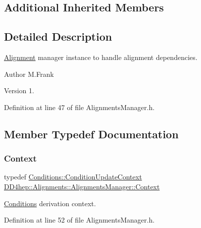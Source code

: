 \subsection*{Additional Inherited Members}


\subsection{Detailed Description}
\hyperlink{class_d_d4hep_1_1_alignments_1_1_alignment}{Alignment} manager instance to handle alignment dependencies. 

\begin{DoxyAuthor}{Author}
M.\+Frank 
\end{DoxyAuthor}
\begin{DoxyVersion}{Version}
1. 
\end{DoxyVersion}


Definition at line 47 of file Alignments\+Manager.\+h.



\subsection{Member Typedef Documentation}
\hypertarget{class_d_d4hep_1_1_alignments_1_1_alignments_manager_a6756d14a9af79dbc28296c765f6bf581}{}\label{class_d_d4hep_1_1_alignments_1_1_alignments_manager_a6756d14a9af79dbc28296c765f6bf581} 
\subsubsection{\texorpdfstring{Context}{Context}}
{\footnotesize\ttfamily typedef \hyperlink{class_d_d4hep_1_1_conditions_1_1_condition_update_context}{Conditions\+::\+Condition\+Update\+Context} \hyperlink{class_d_d4hep_1_1_alignments_1_1_alignments_manager_a6756d14a9af79dbc28296c765f6bf581}{D\+D4hep\+::\+Alignments\+::\+Alignments\+Manager\+::\+Context}}



\hyperlink{namespace_d_d4hep_1_1_conditions}{Conditions} derivation context. 



Definition at line 52 of file Alignments\+Manager.\+h.

\hypertarget{class_d_d4hep_1_1_alignments_1_1_alignments_manager_ae8068cb8b252db1243c87eccad69e980}{}\label{class_d_d4hep_1_1_alignments_1_1_alignments_manager_ae8068cb8b252db1243c87eccad69e980} 
